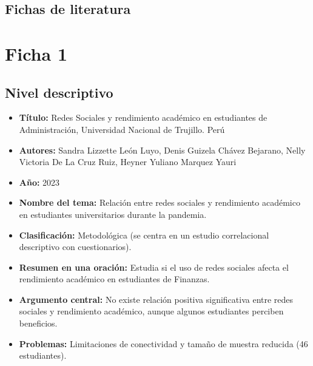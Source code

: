 \documentclass[12pt]{article}
\begin{document}
\subsection{Fichas de literatura}

\section*{Ficha 1}

\subsection*{Nivel descriptivo}
\begin{itemize}
  \item \textbf{Título:} Redes Sociales y rendimiento académico en estudiantes de Administración, Universidad Nacional de Trujillo. Perú
  \item \textbf{Autores:} Sandra Lizzette León Luyo, Denis Guizela Chávez Bejarano, Nelly Victoria De La Cruz Ruiz, Heyner Yuliano Marquez Yauri
  \item \textbf{Año:} 2023
  \item \textbf{Nombre del tema:} Relación entre redes sociales y rendimiento académico en estudiantes universitarios durante la pandemia.
  \item \textbf{Clasificación:} Metodológica (se centra en un estudio correlacional descriptivo con cuestionarios).
  \item \textbf{Resumen en una oración:} Estudia si el uso de redes sociales afecta el rendimiento académico en estudiantes de Finanzas.
  \item \textbf{Argumento central:} No existe relación positiva significativa entre redes sociales y rendimiento académico, aunque algunos estudiantes perciben beneficios.
  \item \textbf{Problemas:} Limitaciones de conectividad y tamaño de muestra reducida (46 estudiantes).
\end{itemize}
\end{document}
